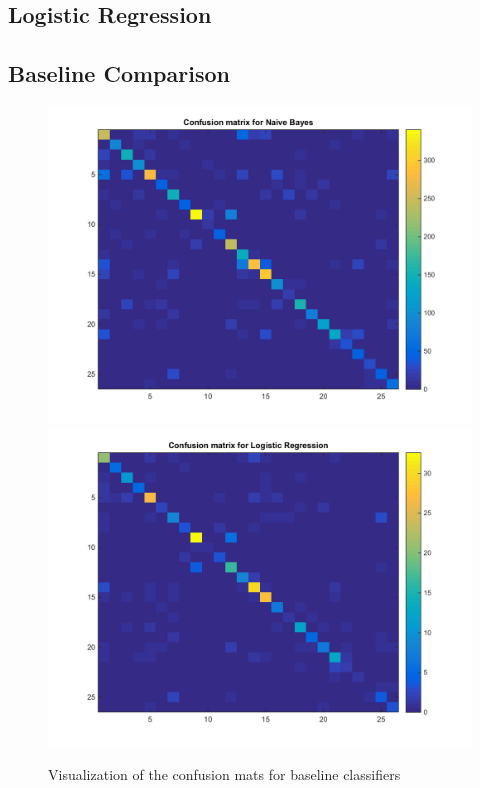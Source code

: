 \documentclass{article} %
\begin{document}
\subsection{Logistic Regression}

\subsection{Baseline Comparison}
\begin{figure}[h]
\begin{center}
\includegraphics[scale=0.3]{confusionnb.png}
\includegraphics[scale=0.3]{confusionlr.png}
\end{center}
\caption{Visualization of the confusion mats for baseline classifiers}
\end{figure}
\end{document}

